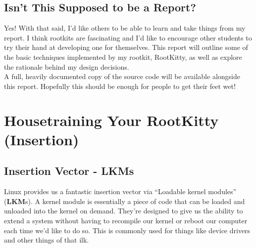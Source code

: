 \documentclass[11pt]{article}
\begin{document}
\subsection{Isn't This Supposed to be a Report?}
Yes! With that said, I'd like others to be able to learn and take things from my report. I think rootkits are fascinating and I'd like to encourage other students to try their hand at developing one for themselves. This report will outline some of the basic techniques implemented by my rootkit, RootKitty, as well as explore the rationale behind my design decisions.\\

A full, heavily documented copy of the source code will be available alongside this report. Hopefully this should be enough for people to get their feet wet!\\

\newpage


\section{Housetraining Your RootKitty (Insertion)}

\subsection{Insertion Vector - LKMs}
Linux provides us a fantastic insertion vector via “Loadable kernel modules” (\textbf{LKM}s). A kernel module is essentially a piece of code that can be loaded and unloaded into the kernel on demand. They’re designed to give us the ability to extend a system without having to recompile our kernel or reboot our computer each time we'd like to do so. This is commonly used for things like device drivers and other things of that ilk.\\
\end{document}
